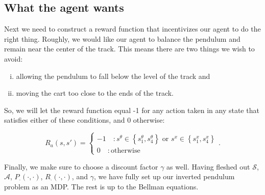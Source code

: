 \documentclass[12pt]{article}
\begin{document}

\subsection{What the agent wants}

Next we need to construct a reward function that incentivizes our agent to do the right thing. Roughly, we would like our agent to balance the pendulum and remain near the center of the track. This means there are two things we wish to avoid:

\begin{enumerate}[(i)]
\item{allowing the pendulum to fall below the level of the track and}
\item{moving the cart too close to the ends of the track.}
\end{enumerate}

So, we will let the reward function equal -1 for any action taken in any state that satisfies either of these conditions, and 0 otherwise:

\begin{equation}
R_a(s, s') = \left\{
\begin{array}{lr}
-1 \quad : s^\theta \in \left\{s_1^\theta, s_4^\theta \right\}\mbox{ or }s^x \in \left\{s_1^x, s_4^x \right\} \\
0 \quad : \mbox{otherwise}
\end{array}
\right.
.
\end{equation}

Finally, we make sure to choose a discount factor $\gamma$ as well. Having fleshed out $\mathscr{S}$, $\mathscr{A}$, $P_\cdot(\cdot, \cdot)$, $R_\cdot(\cdot, \cdot)$, and $\gamma$, we have fully set up our inverted pendulum problem as an MDP. The rest is up to the Bellman equations.
\end{document}
